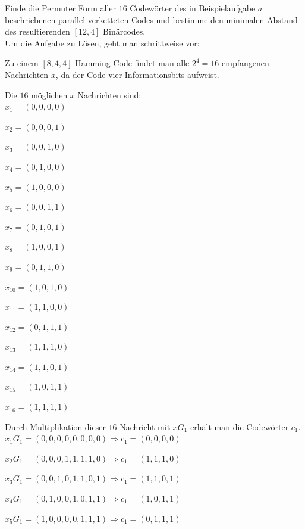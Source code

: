 \begin{Beispiel}
    Finde die Permuter Form aller $16$ Codewörter des in Beispielaufgabe $a$ beschriebenen parallel verketteten Codes und bestimme den minimalen Abstand des resultierenden $[12, 4]$ Binärcodes.\\
    
    Um die Aufgabe zu Lösen, geht man schrittweise vor:
    
    Zu einem $[8, 4, 4]$ Hamming-Code findet man alle $2^4 = 16$ empfangenen Nachrichten $x$, da der Code vier Informationsbits aufweist.
    
    Die $16$ möglichen $x$ Nachrichten sind:\\
    
    $x_1= (0,0,0,0)$
    
    $x_2= (0,0,0,1)$
    
    $x_3= (0,0,1,0)$ 
    
    $x_4= (0,1,0,0)$ 
    
    $x_5= (1,0,0,0)$ 
    
    $x_6= (0,0,1,1)$ 
    
    $x_7= (0,1,0,1)$ 
    
    $x_8= (1,0,0,1)$ 
    
    $x_9= (0,1,1,0)$ 
    
    $x_{10}= (1,0,1,0)$ 
    
    $x_{11}= (1,1,0,0)$ 
    
    $x_{12}= (0,1,1,1)$ 
    
    $x_{13}= (1,1,1,0)$ 
    
    $x_{14}= (1,1,0,1)$ 
    
    $x_{15}= (1,0,1,1)$ 
    
    $x_{16}= (1,1,1,1)$\\
    \pagebreak
    
    Durch Multiplikation dieser $16$ Nachricht mit $xG_1$ erhält man die Codewörter $c_1$.\\
    
    $x_1G_1= (0,0,0,0,0,0,0,0) \Rightarrow c_1= (0,0,0,0)$
    
    $x_2G_1= (0,0,0,1,1,1,1,0) \Rightarrow c_1= (1,1,1,0)$
    
    $x_3G_1= (0,0,1,0,1,1,0,1) \Rightarrow c_1= (1,1,0,1)$
    
    $x_4G_1= (0,1,0,0,1,0,1,1) \Rightarrow c_1= (1,0,1,1)$
    
    $x_5G_1= (1,0,0,0,0,1,1,1) \Rightarrow c_1= (0,1,1,1)$
    

\end{Beispiel}
